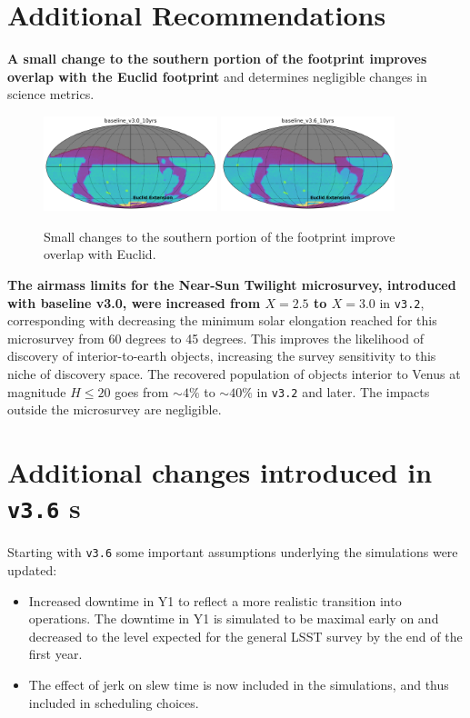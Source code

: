 \section{Additional Recommendations}\label{sec:additional}

{\bf A small change to the southern portion of the footprint improves overlap with the Euclid footprint} and determines negligible changes in science metrics. 
\begin{figure}
\centering
\includegraphics[width=0.45\textwidth]{figures/baseline_v3_0_10yrs_euclid_overlap.png}
\includegraphics[width=0.45\textwidth]{figures/baseline_v3_6_10yrs_euclid_overlap.png}

\caption{Small changes to the southern portion of the footprint improve overlap with Euclid.}
\end{figure}

{\bf The airmass limits for the Near-Sun Twilight microsurvey, introduced with baseline v3.0, were increased from $X=2.5$ to $X=3.0$} in \texttt{v3.2}, corresponding with decreasing the minimum solar elongation reached for this microsurvey from 60 degrees to 45 degrees. This improves the likelihood of discovery of interior-to-earth objects, increasing the survey sensitivity to this niche of discovery space. The recovered population of objects
interior to Venus at magnitude $H\leq20$ goes from $\sim4\%$ to $\sim40\%$ in \texttt{v3.2} and later. The impacts outside the microsurvey are negligible.

\section{Additional changes introduced in \texttt{v3.6} \opsim s }\label{sec:opsimchanges}
Starting with \texttt{v3.6} some important assumptions underlying the simulations were updated: 
\begin{itemize}
\item Increased downtime in Y1 to reflect a more realistic transition into operations. The downtime in Y1 is simulated to be maximal early on and decreased to the level expected for the general LSST survey by the end of the first year. 
\item The effect of jerk on slew time is now included in the simulations, and thus included in scheduling choices.
\end{itemize}


